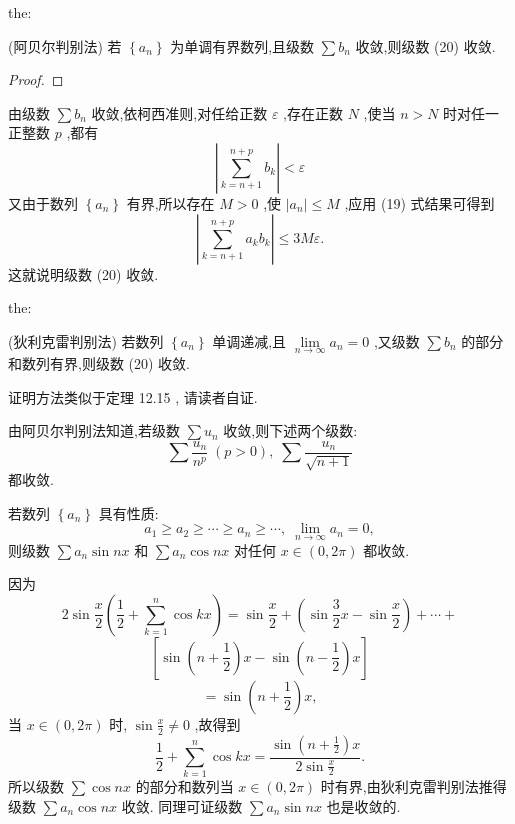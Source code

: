 \begin{theorem}{}{the:}

\end{theorem}
 (阿贝尔判别法) 若 \(\left\{  {a}_{n}\right\}\) 为单调有界数列,且级数 \(\sum {b}_{n}\) 收敛,则级数 (20) 收敛.

\begin{proof}

\end{proof}
由级数 \(\sum {b}_{n}\) 收敛,依柯西准则,对任给正数 \(\varepsilon\) ,存在正数 \(N\) ,使当 \(n > N\) 时对任一正整数 \(p\) ,都有
\[
\left| {\mathop{\sum }\limits_{{k = n + 1}}^{{n + p}}{b}_{k}}\right|  < \varepsilon
\]
又由于数列 \(\left\{  {a}_{n}\right\}\) 有界,所以存在 \(M > 0\) ,使 \(\left| {a}_{n}\right|  \leq  M\) ,应用 (19) 式结果可得到
\[
\left| {\mathop{\sum }\limits_{{k = n + 1}}^{{n + p}}{a}_{k}{b}_{k}}\right|  \leq  {3M\varepsilon }.
\]
这就说明级数 (20) 收敛.

\begin{theorem}{}{the:}

\end{theorem}
 (狄利克雷判别法) 若数列 \(\left\{  {a}_{n}\right\}\) 单调递减,且 \(\mathop{\lim }\limits_{{n \rightarrow  \infty }}{a}_{n} = 0\) ,又级数 \(\sum {b}_{n}\) 的部分和数列有界,则级数 (20) 收敛.

证明方法类似于定理 12.15 , 请读者自证.

由阿贝尔判别法知道,若级数 \(\sum {u}_{n}\) 收敛,则下述两个级数:
\[
\sum \frac{{u}_{n}}{{n}^{p}}\;\left( {p > 0}\right) ,\;\sum \frac{{u}_{n}}{\sqrt{n + 1}}
\]
都收敛.

\begin{example}

\end{example}
若数列 \(\left\{  {a}_{n}\right\}\) 具有性质:
\[
{a}_{1} \geq  {a}_{2} \geq  \cdots  \geq  {a}_{n} \geq  \cdots ,\;\mathop{\lim }\limits_{{n \rightarrow  \infty }}{a}_{n} = 0,
\]
则级数 \(\sum {a}_{n}\sin {nx}\) 和 \(\sum {a}_{n}\cos {nx}\) 对任何 \(x \in  \left( {0,{2\pi }}\right)\) 都收敛.

\begin{solution}

\end{solution}
因为
\[
2\sin \frac{x}{2}\left( {\frac{1}{2} + \mathop{\sum }\limits_{{k = 1}}^{n}\cos {kx}}\right)  = \sin \frac{x}{2} + \left( {\sin \frac{3}{2}x - \sin \frac{x}{2}}\right)  + \cdots  +
\]
\[
\left\lbrack  {\sin \left( {n + \frac{1}{2}}\right) x - \sin \left( {n - \frac{1}{2}}\right) x}\right\rbrack
\]
\[
= \sin \left( {n + \frac{1}{2}}\right) x,
\]
当 \(x \in  \left( {0,{2\pi }}\right)\) 时, \(\sin \frac{x}{2} \neq  0\) ,故得到
\[
\frac{1}{2} + \mathop{\sum }\limits_{{k = 1}}^{n}\cos {kx} = \frac{\sin \left( {n + \frac{1}{2}}\right) x}{2\sin \frac{x}{2}}. \tag{21}
\]
所以级数 \(\sum \cos {nx}\) 的部分和数列当 \(x \in  \left( {0,{2\pi }}\right)\) 时有界,由狄利克雷判别法推得级数 \(\sum {a}_{n}\cos {nx}\) 收敛. 同理可证级数 \(\sum {a}_{n}\sin {nx}\) 也是收敛的.

